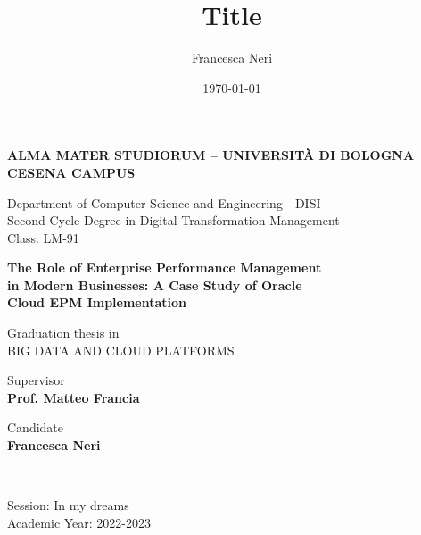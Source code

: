 \title{Title}
\author{Francesca Neri}
\date{\today}

\begin{titlepage}
	\begin{center}
		
		\large
		\textbf{ALMA MATER STUDIORUM -- UNIVERSITÀ DI BOLOGNA \\ CESENA CAMPUS}
		\\
		\noindent\hrulefill
		\vspace{0.4cm}
		
		Department of Computer Science and Engineering - DISI \\
            \vspace{0.1cm}
		Second Cycle Degree in Digital Transformation Management \\
            \vspace{0.1cm}
            Class: LM-91
		
		\Large
		\vspace{4cm}
		\textbf{
			The Role of Enterprise Performance Management \\ 
            in Modern Businesses: A Case Study of Oracle \\
            Cloud EPM Implementation
		}
		
		\large
		\vspace{2cm}
		Graduation thesis in \\
		\vspace{0.2cm}
		\textsc{BIG DATA AND CLOUD PLATFORMS}
		
		\vspace{5.5cm}
		\begin{minipage}[t]{0.64\textwidth}
			\begin{flushleft}
				Supervisor \\
				\vspace{0.2cm}
				\textbf{Prof. Matteo Francia}
			\end{flushleft}
		\end{minipage}
		\begin{minipage}[t]{0.34\textwidth}
			\begin{flushright}
				Candidate \\
				\vspace{0.2cm}
				\textbf{Francesca Neri}
			\end{flushright}
		\end{minipage}\\
		
		\vfill
		\noindent\hrulefill
		\vspace{0.3cm}
		\large
		
		Session: In my dreams
		\\
		Academic Year: 2022-2023
	\end{center}
\end{titlepage}
\restoregeometry
